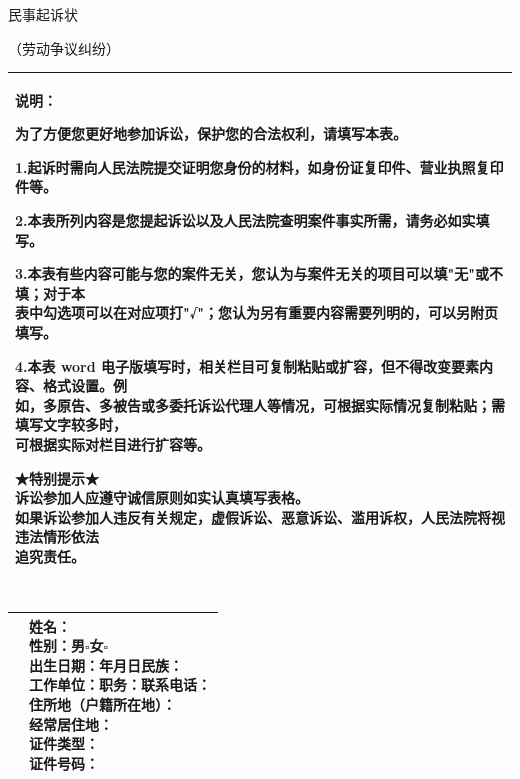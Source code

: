 \documentclass[a4paper,12pt,twoside]{ctexart}
\newcommand{\lawtitle}[2]{
    \vspace*{0.507cm}
    \begin{center}
        {\fzdbs\fontsize{22bp}{22bp}\selectfont #1}\par
        \vspace{10.37bp}
        {\fzdbs\fontsize{18bp}{18bp}\selectfont #2}\par
    \end{center}
    \vspace{18.4bp}
}
\newlength{\lawfullcellwidth}
\newlength{\lawleftcolwidth}
\newlength{\lawrightcolwidth}
\newlength{\lawrightcontentwidth}
\newcommand{\lawpar}{\par\vspace*{-4.86bp}}
\newcommand{\subtitlesection}[1]{%
    \par\noindent\hspace*{-19.28bp}%
    {\renewcommand{\arraystretch}{1}%
    \begin{tabular}{|>{\centering\arraybackslash}m{\lawfullcellwidth}|}
    \hline
    {\fzdbs\fontsize{15bp}{15bp}\selectfont\color{inkblack} #1}\\[-0.5pt]
    \hline
    \end{tabular}}%
    \vspace*{-0.5pt}%
}
\newcommand{\pairsection}[2]{%
    \par\noindent\hspace*{-19.28bp}%
    {\renewcommand{\arraystretch}{1}%
    \begin{tabular}{|>{\centering\arraybackslash}m{\lawleftcolwidth}|m{\lawrightcolwidth}|}
    \hline
    {\parbox[c]{\lawleftcolwidth}{\centering\songti\fontsize{10.5bp}{10.5bp}\selectfont\color{inkblack} #1}} &
    {\hspace*{4bp}\parbox[t]{\lawrightcontentwidth}{%
        \vspace{4bp}%
        \songti\mdseries\fontsize{10.5bp}{17bp}\selectfont%
        \baselineskip=17bp%
        \setlength{\parindent}{0pt}%
        \color{inkblack}%
        #2%
        \vspace{4bp}%
    }}\\[-0.5pt]
    \hline
    \end{tabular}}%
    \vspace*{-0.5pt}%
}
\newcommand{\notesection}[1]{%
    \par\noindent\hspace*{-19.28bp}%
    {\renewcommand{\arraystretch}{1}%
    \begin{tabular}{|m{\lawfullcellwidth}|}
    \hline
    {\hspace*{4bp}\parbox[t]{462.72bp}{%
        \vspace{4.69bp}%
        \color{inkblack}\fontsize{10.5bp}{10.5bp}\selectfont #1%
        \vspace{4.69bp}%
    }}\\[-0.5pt]
    \hline
    \end{tabular}}%
    \vspace*{-0.5pt}%
}
\begin{document}
\setcounter{page}{232}

\lawtitle{民事起诉状}{（劳动争议纠纷）}

\notesection{
\hfuzz=50pt
\color{inkblack}\heiti\fontsize{10.5bp}{16bp}\selectfont 说明：\par
\vspace*{-0.2bp}
\songti\mdseries\fontsize{10.5bp}{16bp}\selectfont
\setlength{\parindent}{20.7bp}
\sloppy
\setlength{\parskip}{0pt}
\vspace*{-5.1bp}为了方便您更好地参加诉讼，保护您的合法权利，请填写本表。
\lawpar
1.起诉时需向人民法院提交证明您身份的材料，如身份证复印件、营业执照复印件等。
\lawpar
2.本表所列内容是您提起诉讼以及人民法院查明案件事实所需，请务必如实填写。
\lawpar
3.本表有些内容可能与您的案件无关，您认为与案件无关的项目可以填"无"或不填；对于本\\[-4.86bp]
表中勾选项可以在对应项打"√"；您认为另有重要内容需要列明的，可以另附页填写。
\lawpar
4.本表 word 电子版填写时，相关栏目可复制粘贴或扩容，但不得改变要素内容、格式设置。例\\[-4.86bp]
如，多原告、多被告或多委托诉讼代理人等情况，可根据实际情况复制粘贴；需填写文字较多时，\\[-4.86bp]
可根据实际对栏目进行扩容等。
\lawpar
{\fzssk ★}特别提示{\fzssk ★}\\[-4.86bp]
\hspace*{20.7bp}诉讼参加人应遵守诚信原则如实认真填写表格。\\[-4.86bp]
\hspace*{20.7bp}如果诉讼参加人违反有关规定，虚假诉讼、恶意诉讼、滥用诉权，人民法院将视违法情形依法\\[-4.86bp]
追究责任。
}

\subtitlesection{当事人信息}

\pairsection{原告\\（自然人）}{
姓名：\\
性别：男$\square$\hspace{1em}女$\square$\\
出生日期：\hspace{2em}年\hspace{2em}月\hspace{2em}日\hspace{4em}民族：\\
工作单位：\hspace{6em}职务：\hspace{4em}联系电话：\\
住所地（户籍所在地）：\\
经常居住地：\\
证件类型：\\
证件号码：\\
\mbox{}
}
\end{document}
